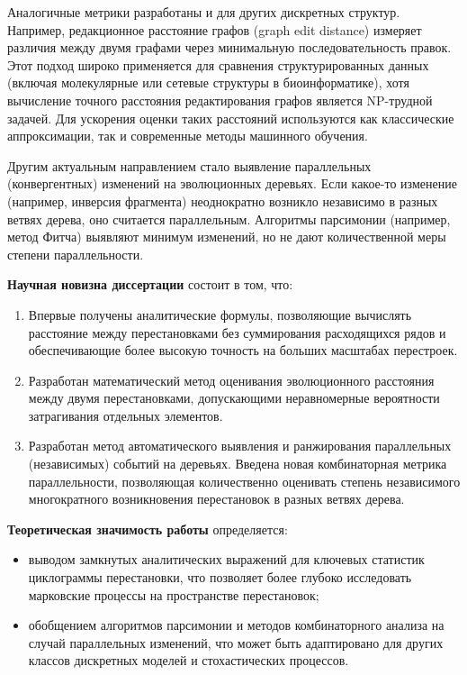 Аналогичные метрики разработаны и для других дискретных структур. Например, редакционное расстояние графов (graph edit distance) измеряет различия между двумя графами через минимальную последовательность правок. Этот подход широко применяется для сравнения структурированных данных (включая молекулярные или сетевые структуры в биоинформатике), хотя вычисление точного расстояния редактирования графов является NP-трудной задачей. Для ускорения оценки таких расстояний используются как классические аппроксимации, так и современные методы машинного обучения.

Другим актуальным направлением стало выявление параллельных (конвергентных) изменений на эволюционных деревьях. Если какое-то изменение (например, инверсия фрагмента) неоднократно возникло независимо в разных ветвях дерева, оно считается параллельным. Алгоритмы парсимонии (например, метод Фитча) выявляют минимум изменений, но не дают количественной меры степени параллельности. 

\textbf{Научная новизна диссертации} состоит в том, что: 
\begin{enumerate}[label=(\arabic*)]
    \item Впервые получены аналитические формулы, позволяющие вычислять расстояние между перестановками без суммирования расходящихся рядов и обеспечивающие более высокую точность на больших масштабах перестроек.
    \item Разработан математический метод оценивания эволюционного расстояния между двумя перестановками, допускающими неравномерные вероятности затрагивания отдельных элементов.
    \item Разработан метод автоматического выявления и ранжирования параллельных (независимых) событий на деревьях. Введена новая комбинаторная метрика параллельности, позволяющая количественно оценивать степень независимого многократного возникновения перестановок в разных ветвях дерева.
\end{enumerate}

\textbf{Теоретическая значимость работы} определяется: 
\begin{itemize}
    \item выводом замкнутых аналитических выражений для ключевых статистик циклограммы перестановки, что позволяет более глубоко исследовать марковские процессы на пространстве перестановок;
    \item обобщением алгоритмов парсимонии и методов комбинаторного анализа на случай параллельных изменений, что может быть адаптировано для других классов дискретных моделей и стохастических процессов.
\end{itemize}

